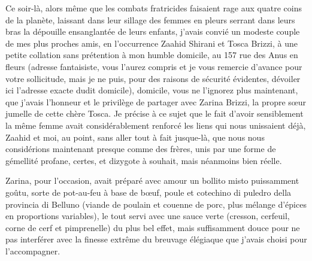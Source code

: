 %

\scene

\illusloflabel{}%

Ce soir-là, alors même que les combats fratricides faisaient rage aux quatre coins de la planète, laissant dans leur sillage des femmes en pleurs serrant dans leurs bras la dépouille ensanglantée de leurs enfants, j’avais convié un modeste couple de mes plus proches amis, en l’occurrence Zaahid Shirani et Tosca Brizzi, à une petite collation sans prétention à mon humble domicile, au 157 rue des Anus en fleurs (adresse fantaisiste, vous l’aurez compris et je vous remercie d’avance pour votre sollicitude, mais je ne puis, pour des raisons de sécurité évidentes, dévoiler ici l’adresse exacte dudit domicile), domicile, vous ne l’ignorez plus maintenant, que j’avais l’honneur et le privilège de partager avec Zarina Brizzi, la propre sœur jumelle de cette chère Tosca. Je précise à ce sujet que le fait d’avoir sensiblement la même femme avait considérablement renforcé les liens qui nous unissaient déjà, Zaahid et moi, au point, sans aller tout à fait jusque-là, que nous nous considérions maintenant presque comme des frères, unis par une forme de gémellité profane, certes, et dizygote à souhait, mais néanmoins bien réelle.

Zarina, pour l’occasion, avait préparé avec amour un \foreignlanguage{italian}{bollito misto} puissamment goûtu, sorte de pot-au-feu à base de bœuf, poule et \foreignlanguage{italian}{cotechino di puledro della provincia di Belluno} (viande de poulain et couenne de porc, plus mélange d’épices en proportions variables), le tout servi avec une sauce verte (cresson, cerfeuil, corne de cerf et pimprenelle) du plus bel effet, mais suffisamment douce pour ne pas interférer avec la finesse extrême du breuvage élégiaque que j’avais choisi pour l’accompagner.

